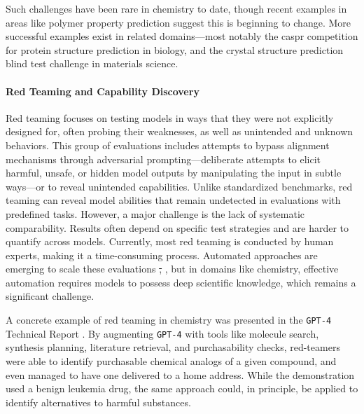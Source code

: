 \documentclass[11pt, oneside]{article}
\makeatletter
\newcommand{\modelname}[1]{\texttt{#1}}
\providecommand{\DIFdeltex}[1]{{\protect\color{red}\sout{#1}}} %
\providecommand{\DIFdelbegin}{} %
\providecommand{\DIFdelend}{} %
\providecommand{\DIFdel}[1]{\texorpdfstring{\DIFdeltex{#1}}{}} %
\newcommand{\DIFscaledelfig}{0.5}
\newlength{\DIFdelgraphicswidth} %
\newlength{\DIFdelgraphicsheight} %
\newcommand{\DIFdelincludegraphics}[2][]{%
\sbox{\DIFdelgraphicsbox}{\DIFOincludegraphics[#1]{#2}}%
\settoboxwidth{\DIFdelgraphicswidth}{\DIFdelgraphicsbox} %
\settoboxtotalheight{\DIFdelgraphicsheight}{\DIFdelgraphicsbox} %
\scalebox{\DIFscaledelfig}{%
\parbox[b]{\DIFdelgraphicswidth}{\usebox{\DIFdelgraphicsbox}\\[-\baselineskip] \rule{\DIFdelgraphicswidth}{0em}}\llap{\resizebox{\DIFdelgraphicswidth}{\DIFdelgraphicsheight}{%
\setlength{\unitlength}{\DIFdelgraphicswidth}%
\begin{picture}(1,1)%
\thicklines\linethickness{2pt} %
{\color[rgb]{1,0,0}\put(0,0){\framebox(1,1){}}}%
{\color[rgb]{1,0,0}\put(0,0){\line( 1,1){1}}}%
{\color[rgb]{1,0,0}\put(0,1){\line(1,-1){1}}}%
\end{picture}%
}\hspace*{3pt}}} %
} %
\DeclareRobustCommand{\DIFdelbegin}{\DIFOdelbegin \let\includegraphics\DIFdelincludegraphics} %
\DeclareRobustCommand{\DIFdelend}{\DIFOaddend \let\includegraphics\DIFOincludegraphics} %
\let\sout@orig\sout %
\renewcommand{\sout}[1]{\ifmmode\text{\sout@orig{\ensuremath{#1}}}\else\sout@orig{#1}\fi} %
\makeatother
\begin{document}
Such challenges have been rare in chemistry to date, though recent examples in areas like polymer property prediction \autocite{gang2025neurips} suggest this is beginning to change. 
More successful examples exist in related domains---most notably the \gls{caspr} competition\autocite{Moult2005} for protein structure prediction in biology, and the crystal structure prediction blind test challenge\autocite{Lommerse2000} in materials science.

\paragraph{Red Teaming and Capability Discovery} \label{para:red_teaming}
Red teaming focuses on testing models in ways that they were not explicitly designed for, often probing their weaknesses, as well as unintended and unknown behaviors. \autocite{perez2022red, ganguli2022red} 
This group of evaluations includes attempts to bypass alignment mechanisms through adversarial prompting---deliberate attempts to elicit harmful, unsafe, or hidden model outputs by manipulating the input in subtle ways---or to reveal unintended capabilities. \autocite{zhu2023prompt, kumar2023computation} 
Unlike standardized benchmarks, red teaming can reveal model abilities that remain undetected in evaluations with predefined tasks. However, a major challenge is the lack of systematic comparability. 
Results often depend on specific test strategies and are harder to quantify across models. Currently, most red teaming is conducted by human experts, making it a time-consuming process. Automated approaches are emerging to scale these evaluations \DIFdelbegin \DIFdel{, }\DIFdelend \autocite{ge2023mart0}, but in domains like chemistry, effective automation requires models to possess deep scientific knowledge, which remains a significant challenge. 

A concrete example of red teaming in chemistry was presented in the \modelname{GPT-4} Technical Report \autocite{openai2023gpt04}. 
By augmenting \modelname{GPT-4} with tools like molecule search, synthesis planning, literature retrieval, and purchasability checks, red-teamers were able to identify purchasable chemical analogs of a given compound, and even managed to have one delivered to a home address. 
While the demonstration used a benign leukemia drug, the same approach could, in principle, be applied to identify alternatives to harmful substances.\autocite{urbina2022dual}
\end{document}

